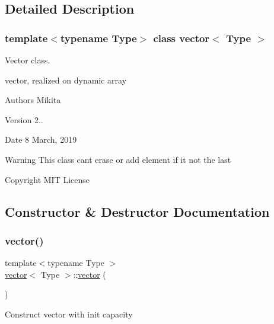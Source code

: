 \subsection{Detailed Description}
\subsubsection*{template$<$typename Type$>$\newline
class vector$<$ Type $>$}

Vector class. 

vector, realized on dynamic array \begin{DoxyAuthor}{Authors}
Mikita 
\end{DoxyAuthor}
\begin{DoxyVersion}{Version}
2.. 
\end{DoxyVersion}
\begin{DoxyDate}{Date}
8 March, 2019 
\end{DoxyDate}
\begin{DoxyWarning}{Warning}
This class can\textquotesingle{}t erase or add element if it not the last 
\end{DoxyWarning}
\begin{DoxyCopyright}{Copyright}
M\+IT License 
\end{DoxyCopyright}


\subsection{Constructor \& Destructor Documentation}
\mbox{\label{classvector_ab8d8ebaa9b91a05bb7a94371cb84c042}} 
\subsubsection{\texorpdfstring{vector()}{vector()}\hspace{0.1cm}{\footnotesize\ttfamily [1/2]}}
{\footnotesize\ttfamily template$<$typename Type $>$ \\
\hyperlink{classvector}{vector}$<$ Type $>$\+::\hyperlink{classvector}{vector} (\begin{DoxyParamCaption}{ }\end{DoxyParamCaption})}

Construct vector with init capacity \mbox{\label{classvector_a10b4b80ca03a29381b4d75bd8f64a32b}} 
